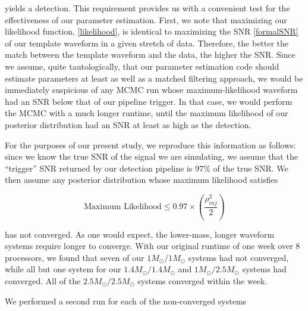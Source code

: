 \documentclass{emulateapj}
\begin{document}
\noindent  yields a detection.  This requirement provides us with a convenient test for the effectiveness of our parameter estimation.  First, we note that maximizing our likelihood function, \eqref{likelihood}, is identical to maximizing the SNR \eqref{formalSNR} of our template waveform in a given stretch of data.  Therefore, the better the match between the template waveform and the data, the higher the SNR.  Since we assume, quite tautologically, that our parameter estimation code should estimate parameters at least as well as a matched filtering approach, we would be immediately suspicious of any MCMC run whose maximum-likelihood waveform had an SNR below that of our pipeline trigger.   In that case, we would perform the MCMC with a much longer runtime, until the maximum likelihood of our posterior distribution had an SNR at least as high as the detection.

For the purposes of our present study, we reproduce this information as follows: since we know the true SNR of the signal we are simulating, we assume that the ``trigger'' SNR returned by our detection pipeline is 97\% of the true SNR.  We then assume any posterior distribution whose maximum likelihood satisfies

\begin{equation}
\text{Maximum Likelihood} \leq 0.97 \times \left(\frac{\rho_{inj}^2}{2}\right) 
\nonumber
\end{equation}

\noindent has not converged.  As one would expect, the lower-mass, longer waveform systems require longer to converge.  With our original runtime of one week over 8 processors, we found that seven of our $1M_{\odot}/1M_{\odot}$ systems had not converged, while all but one system for our $1.4M_{\odot}/1.4M_{\odot}$ and $1M_{\odot}/2.5M_{\odot}$ systems had converged.  All of the $2.5M_{\odot}/2.5M_{\odot}$ systems converged within the week.  

We performed a second run for each of the non-converged systems


{}
\end{document}
